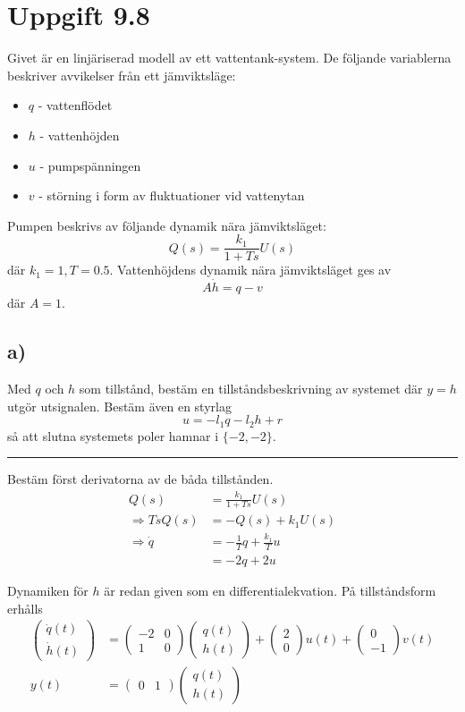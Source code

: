 \documentclass[12pt]{article}
\newcommand{\qline}{\hrule \vspace*{10pt}}
\begin{document}
\section*{Uppgift 9.8}
Givet är en linjäriserad modell av ett vattentank-system. De följande variablerna beskriver avvikelser från ett jämviktsläge:
\begin{itemize}
\item $q$ - vattenflödet
\item $h$ - vattenhöjden
\item $u$ - pumpspänningen
\item $v$ - störning i form av fluktuationer vid vattenytan
\end{itemize}
Pumpen beskrivs av följande dynamik nära jämviktsläget: 
\[Q(s) = \frac{k_1}{1+Ts}U(s)\]
där $k_1 = 1, T = 0.5$. Vattenhöjdens dynamik nära jämviktsläget ges av 
\[A\dot{h} = q-v\]
där $A = 1$.

\subsection*{a)}
Med $q$ och $h$ som tillstånd, bestäm en tillståndsbeskrivning av systemet där $y = h$ utgör utsignalen. Bestäm även en styrlag 
\[u = -l_1q-l_2h+r\]
så att slutna systemets poler hamnar i $\lbrace -2, -2 \rbrace$.
\qline
Bestäm först derivatorna av de båda tillstånden.
\begin{align*}
  Q(s) &= \frac{k_1}{1+Ts}U(s) \\
  \Rightarrow TsQ(s) &= -Q(s) + k_1U(s) \\
  \Rightarrow \dot{q} &= -\frac{1}{T}q + \frac{k_1}{T}u \\
  &= -2q+2u
\end{align*}

Dynamiken för $h$ är redan given som en differentialekvation. På tillståndsform erhålls
\begin{align*}
\begin{pmatrix}
  \dot{q}(t) \\
  \dot{h}(t)
\end{pmatrix} &= 
  \begin{pmatrix}
-2 & 0 \\
1 & 0
  \end{pmatrix}\begin{pmatrix}
    q(t) \\
    h(t)
  \end{pmatrix} + \begin{pmatrix}
2 \\
0
  \end{pmatrix}u(t) + \begin{pmatrix}
0 \\
-1
  \end{pmatrix}v(t) \\
  y(t) &= \begin{pmatrix}
0 & 1
  \end{pmatrix}\begin{pmatrix}
q(t) \\
h(t)
  \end{pmatrix}
\end{align*}
\end{document}
